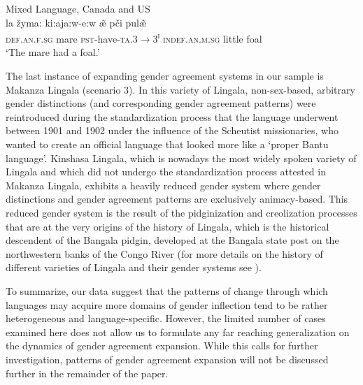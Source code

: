 \documentclass[output=collectionpaper]{langsci/langscibook}
\begin{document}
\ea\label{ex:dgm:10:Michif}
 {Mixed Language, Canada and US} {\citealt[87]{Bakker1997}}\\
\gll la \v{z}yma: ki:aja:w-e:w \~{\ae} p\v{c}i pul\~{\ae} \\
\textsc{def.an.f.sg} mare \textsc{pst-}have-\textsc{ta.3$ \rightarrow $3\textsuperscript{i}} \textsc{indef.an.m.sg} little foal \\
\glt `The mare had a foal.'
\z


The last instance of expanding gender agreement systems in our sample is Makanza Lingala (scenario 3). In this variety of Lingala, non-sex-based, arbitrary gender distinctions (and corresponding gender agreement patterns) were reintroduced during the standardization process that the language underwent between 1901 and 1902 under the influence of the Scheutist missionaries, who wanted to create an official language that looked more like a `proper Bantu language'. Kinshasa Lingala, which is nowadays the most widely spoken variety of Lingala and which did not undergo the standardization process attested in Makanza Lingala, exhibits a heavily reduced gender system where gender distinctions and gender agreement patterns are exclusively animacy-based. This reduced gender system is the result of the pidginization and creolization processes that are at the very origins of the history of Lingala, which is the historical descendent of the Bangala pidgin, developed at the Bangala state post on the northwestern banks of the Congo River (for more details on the history of different varieties of Lingala and their gender systems see \citealt{Bokamba1977,DiGarbo2016,Meeuwis2013}).

To summarize, our data suggest that the patterns of change through which languages may acquire more domains of gender inflection tend to be rather heterogeneous and language-specific. However, the limited number of cases examined here does not allow us to formulate any far reaching generalization on the dynamics of gender agreement expansion. While this calls for further investigation, patterns of gender agreement expansion will not be discussed further in the remainder of the paper.
\end{document}
